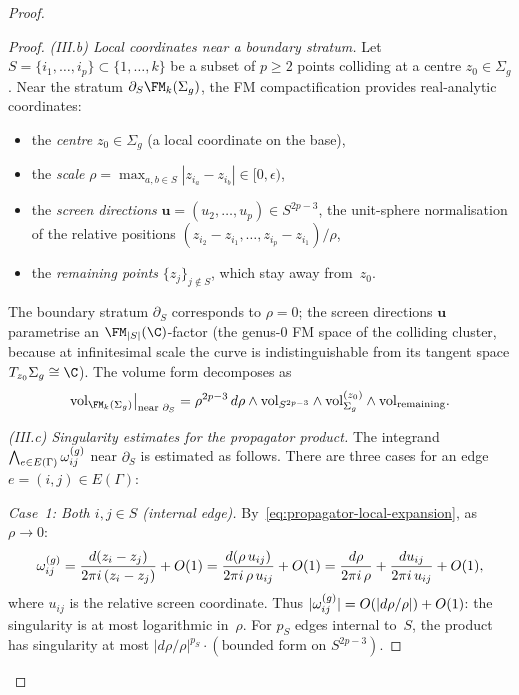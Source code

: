 \begin{proof}
\begin{proof}
\medskip\noindent
\emph{(III.b) Local coordinates near a boundary stratum.}
Let $S = \{i_1, \ldots, i_p\} \subset \{1, \ldots, k\}$ be a
subset of $p \ge 2$ points colliding at a centre
$z_0 \in \Sigma_g$. Near the stratum $\partial_S \FMg{k}$,
the FM compactification provides real-analytic coordinates:
\begin{itemize}
\item the \emph{centre} $z_0 \in \Sigma_g$
 (a local coordinate on the base),
\item the \emph{scale} $\rho = \max_{a,b \in S}
 |z_{i_a} - z_{i_b}| \in [0, \epsilon)$,
\item the \emph{screen directions}
 $\mathbf{u} = (u_2, \ldots, u_p) \in S^{2p-3}$,
 the unit-sphere normalisation of the relative positions
 $(z_{i_2} - z_{i_1}, \ldots, z_{i_p} - z_{i_1})
 / \rho$,
\item the \emph{remaining points}
 $\{z_j\}_{j \notin S}$, which stay away from~$z_0$.
\end{itemize}
The boundary stratum $\partial_S$ corresponds to
$\rho = 0$; the screen directions $\mathbf{u}$ parametrise
an $\FM_{|S|}(\C)$-factor (the genus-$0$ FM space of the
colliding cluster, because at infinitesimal scale the curve
is indistinguishable from its tangent space
$T_{z_0}\Sigma_g \cong \C$). The volume form decomposes as
\begin{equation}\label{eq:volume-form-decomposition}
 \vol_{\FMg{k}}\big|_{\text{near } \partial_S}
 = \rho^{2p - 3}\, d\rho \wedge
 \vol_{S^{2p-3}} \wedge \vol_{\Sigma_g}^{(z_0)}
 \wedge \vol_{\text{remaining}}.
\end{equation}

\medskip\noindent
\emph{(III.c) Singularity estimates for the propagator product.}
The integrand
$\bigwedge_{e \in E(\Gamma)} \omega^{(g)}_{ij}$ near $\partial_S$ is
estimated as follows.
There are three cases for an edge $e = (i,j) \in E(\Gamma)$:

\smallskip
\noindent\emph{Case~1: Both $i, j \in S$ (internal edge).}
By~\eqref{eq:propagator-local-expansion}, as
$\rho \to 0$:
\[
 \omega^{(g)}_{ij}
 = \frac{d(z_i - z_j)}{2\pi i\,(z_i - z_j)} + O(1)
 = \frac{d(\rho\, u_{ij})}
 {2\pi i\, \rho\, u_{ij}} + O(1)
 = \frac{d\rho}{2\pi i\, \rho}
 + \frac{d u_{ij}}{2\pi i\, u_{ij}} + O(1),
\]
where $u_{ij}$ is the relative screen coordinate. Thus
$|\omega^{(g)}_{ij}| = O(|d\rho/\rho|) + O(1)$: the singularity is
at most logarithmic in~$\rho$. For $p_S$ edges internal to~$S$,
the product has singularity at most
$|d\rho/\rho|^{p_S} \cdot (\text{bounded form on } S^{2p-3})$.


\end{proof}
\end{proof}

